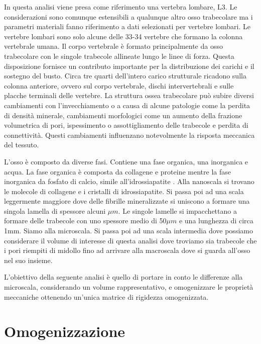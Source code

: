 \documentclass[a4paper,num-refs]{oup-contemporary}
\begin{document}
In questa analisi viene presa come riferimento una vertebra lombare, L3. Le considerazioni sono comunque estensibili a qualunque altro osso trabecolare ma i parametri materiali fanno riferimento a dati selezionati per vertebre lombari.  
Le vertebre lombari sono solo alcune delle 33-34 vertebre che formano la colonna vertebrale umana. Il corpo vertebrale è formato principalmente da osso trabecolare con le singole trabecole allineate lungo le linee di forza. Questa disposizione fornisce un contributo importante per la distribuzione dei carichi e il sostegno del busto. Circa tre quarti dell'intero carico strutturale ricadono sulla colonna anteriore, ovvero sul corpo vertebrale, dischi intervertebrali e sulle placche terminali delle vertebre. La struttura ossea trabecolare può subire diversi cambiamenti con l'invecchiamento o a causa di alcune patologie \citep{Ferguson:2003} come la perdita di densità minerale, cambiamenti morfologici come un aumento della frazione volumetrica di pori, ispessimento o assottigliamento delle trabecole e perdita di connettività. Questi cambiamenti influenzano notevolmente la risposta meccanica del tessuto. 

L'osso è composto da diverse fasi. Contiene una fase organica, una inorganica e acqua. La fase organica è composta da collagene e proteine mentre la fase inorganica da fosfato di calcio, simile all'idrossiapatite \citep{Hamed:2012}. Alla nanoscala si trovano le molecole di collagene e i cristalli di idrossiapatite. Si passa poi ad una scala leggermente maggiore dove delle fibrille mineralizzate si uniscono a formare una singola lamella di spessore alcuni $\mu m$. Le singole lamelle si impacchettano a formare delle trabecole con uno spessore medio di 50$\mu m$ e una lunghezza di circa 1mm. Siamo alla microscala. Si passa poi ad una scala intermedia dove possiamo considerare il volume di interesse di questa analisi dove troviamo sia trabecole che i pori riempiti di midollo fino ad arrivare alla macroscala dove si guarda all'osso nel suo insieme. 

L'obiettivo della seguente analisi è quello di portare in conto le differenze alla microscala, considerando un volume rappresentativo, e omogenizzare le proprietà meccaniche ottenendo un'unica matrice di rigidezza omogenizzata.    








\section{Omogenizzazione}
\end{document}
